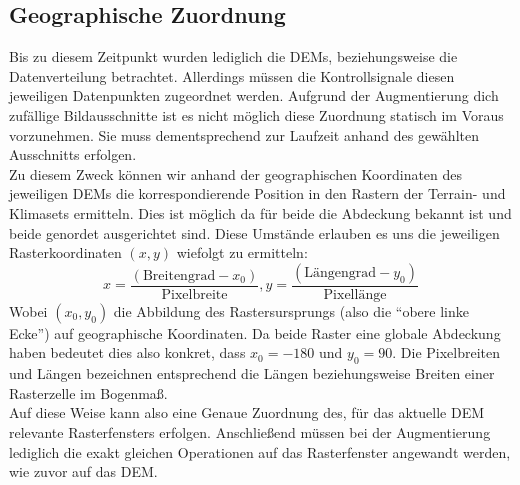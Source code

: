 \subsection{Geographische Zuordnung}

Bis zu diesem Zeitpunkt wurden lediglich die DEMs, beziehungsweise die Datenverteilung betrachtet. Allerdings müssen die Kontrollsignale diesen jeweiligen Datenpunkten zugeordnet werden. Aufgrund der Augmentierung dich zufällige Bildausschnitte ist es nicht möglich diese Zuordnung statisch im Voraus vorzunehmen. Sie muss dementsprechend zur Laufzeit anhand des gewählten Ausschnitts erfolgen. \\
Zu diesem Zweck können wir anhand der geographischen Koordinaten des jeweiligen DEMs die korrespondierende Position in den Rastern der Terrain- und Klimasets ermitteln. Dies ist möglich da für beide die Abdeckung bekannt ist und beide genordet ausgerichtet sind. Diese Umstände erlauben es uns die jeweiligen Rasterkoordinaten $(x,y)$ wiefolgt zu ermitteln:
\begin{equation}
    x = \frac{(\text{Breitengrad} - x_0)}{\text{Pixelbreite}}, 
    y = \frac{(\text{Längengrad} - y_0)}{\text{Pixellänge}}
\end{equation}
Wobei $(x_0, y_0)$ die Abbildung des Rastersursprungs (also die \enquote{obere linke Ecke}) auf geographische Koordinaten. Da beide Raster eine globale Abdeckung haben bedeutet dies also konkret, dass $x_0 = -180$ und $y_0 = 90$. Die Pixelbreiten und Längen bezeichnen entsprechend die Längen beziehungsweise Breiten einer Rasterzelle im Bogenmaß. \\
Auf diese Weise kann also eine Genaue Zuordnung des, für das aktuelle DEM relevante Rasterfensters erfolgen. Anschließend müssen bei der Augmentierung lediglich die exakt gleichen Operationen auf das Rasterfenster angewandt werden, wie zuvor auf das DEM.  